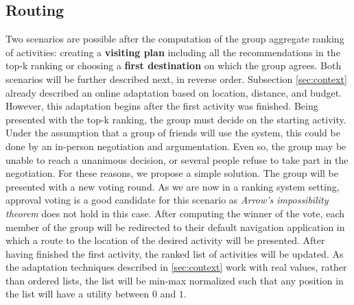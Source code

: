 \documentclass[11pt,a4paper,oneside]{article}
\begin{document}
\subsection{Routing}
\label{sec:routing}
Two scenarios are possible after the computation of the group aggregate ranking of activities: creating a \textbf{visiting plan} including all the recommendations in the top-k ranking or choosing a \textbf{first destination} on which the group agrees. Both scenarios will be further described next, in reverse order. 
Subsection \ref{sec:context} already described an online adaptation based on location, distance, and budget. However, this adaptation begins after the first activity was finished. Being presented with the top-k ranking, the group must decide on the starting activity. Under the assumption that a group of friends will use the system, this could be done by an in-person negotiation and argumentation. Even so, the group may be unable to reach a unanimous decision, or several people refuse to take part in the negotiation. For these reasons, we propose a simple solution. The group will be presented with a new voting round. As we are now in a ranking system setting, approval voting is a good candidate for this scenario as \emph{Arrow's impossibility theorem} does not hold in this case.\cite[p. 257,267]{shohamMultiagentSystemsAlgorithmic} After computing the winner of the vote, each member of the group will be redirected to their default navigation application in which a route to the location of the desired activity will be presented. After having finished the first activity, the ranked list of activities will be updated. As the adaptation techniques described in \autoref{sec:context} work with real values, rather than ordered lists, the list will be min-max normalized such that any position in the list will have a utility between $0$ and $1$.
\end{document}
